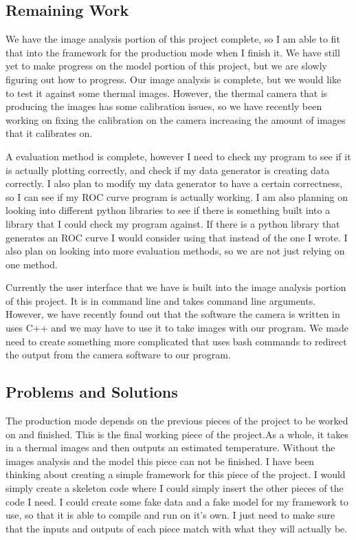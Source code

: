 \documentclass[onecolumn, draftclsnofoot,10pt, compsoc]{IEEEtran}
\begin{document}
\subsection{Remaining Work}
We have the image analysis portion of this project complete, so I am able to fit that into the framework for the production mode when I finish it. We have still yet to make progress on the model portion of this project, but we are slowly figuring out how to progress. Our image analysis is complete, but we would like to test it against some thermal images. However, the thermal camera that is producing the images has some calibration issues, so we have recently been working on fixing the calibration on the camera increasing the amount of images that it calibrates on.

A evaluation method is complete, however I need to check my program to see if it is actually plotting correctly, and check if my data generator is creating data correctly. I also plan to modify my data generator to have a certain correctness, so I can see if my ROC curve program is actually working. I am also planning on looking into different python libraries to see if there is something built into a library that I could check my program against. If there is a python library that generates an ROC curve I would consider using that instead of the one I wrote. I also plan on looking into more evaluation methods, so we are not just relying on one method.

Currently the user interface that we have is built into the image analysis portion of this project. It is in command line and takes command line arguments. However, we have recently found out that the software the camera is written in uses C++ and we may have to use it to take images with our program. We made need to create something more complicated that uses bash commands to redirect the output from the camera software to our program.

\subsection{Problems and Solutions}
The production mode depends on the previous pieces of the project to be worked on and finished. This is the final working piece of the project.As a whole, it takes in a thermal images and then outputs an estimated temperature. Without the images analysis and the model this piece can not be finished. I have been thinking about creating a simple framework for this piece of the project. I would simply create a skeleton code where I could simply insert the other pieces of the code I need. I could create some fake data and a fake model for my framework to use, so that it is able to compile and run on it’s own. I just need to make sure that the inputs and outputs of each piece match with what they will actually be.
\end{document}
